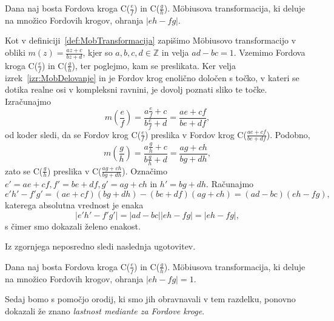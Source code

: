 \documentclass[mat1]{fmfdelo}
\begin{document}
\begin{lema}
Dana naj bosta Fordova kroga C($\frac{e}{f}$) in C($\frac{g}{h}$). M\"{o}biusova transformacija, ki deluje na množico Fordovih krogov, ohranja $|eh-fg|$.
\end{lema}

\begin{dokaz}
Kot v definiciji~\ref{def:MobTransformacija} zapišimo M\"{o}biusovo transformacijo v obliki $m(z) = \frac{az+c}{bz+d}$, kjer so $a,b,c,d \in \mathbb{Z}$ in velja $ad-bc=1$. 
Vzemimo Fordova kroga C($\frac{e}{f}$) in C($\frac{g}{h}$), ter poglejmo, kam se preslikata. 
Ker velja izrek~\ref{izr:MobDelovanje} in je Fordov krog enolično določen s točko, v kateri se dotika realne osi v kompleksni ravnini, je dovolj poznati sliko te točke.
Izračunajmo
\[ m \left(\frac{e}{f} \right) = \frac{a \frac{e}{f} + c}{b \frac{e}{f} + d} = \frac{ae + cf}{be + df}, \]
od koder sledi, da se Fordov krog C($\frac{e}{f}$) preslika v Fordov krog C($\frac{ae+cf}{be+df}$).
Podobno,
\[ m \left(\frac{g}{h} \right) = \frac{a \frac{g}{h} + c}{b \frac{g}{h} + d} = \frac{ag + ch}{bg + dh}, \]
zato se C($\frac{g}{h}$) preslika v C($\frac{ag+ch}{bg+dh}$).
Označimo \( e' = ae+cf, f' = be+df, g' = ag+ch \) in $h' = bg+dh$. Računajmo
\[ e'h'-f'g' = (ae+cf)(bg+dh) - (be+df)(ag+ch) = (ad - bc)(eh - fg), \]
katerega absolutna vrednost je enaka
\[ |e'h'-f'g'| = |ad-bc| |eh-fg| = |eh-fg|, \]
s čimer smo dokazali želeno enakost.
\end{dokaz}

Iz zgornjega neposredno sledi naslednja ugotovitev.

\begin{posledica}
\label{Posl:MobOhr1}
Dana naj bosta Fordova kroga C($\frac{e}{f}$) in C($\frac{g}{h}$). M\"{o}biusova transformacija, ki deluje na množico Fordovih krogov, ohranja $|eh-fg|=1$.
\end{posledica}

Sedaj bomo s pomočjo orodij, ki smo jih obravnavali v tem razdelku, ponovno dokazali že znano \emph{lastnost mediante za Fordove kroge}.
\end{document}
